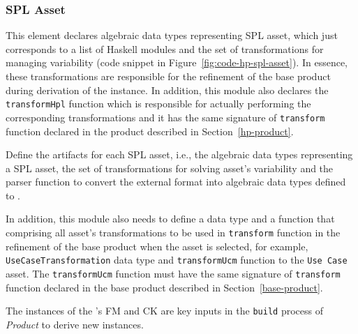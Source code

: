 
\subsubsection{\hp{} SPL Asset} 
\label{hp-spl-asset}

This element declares algebraic data types representing \hp{} SPL asset, which just corresponds to a list of Haskell modules and the set of transformations for managing \hpl{} variability (code snippet in Figure~\ref{fig:code-hp-spl-asset}). In essence, these transformations are responsible for the refinement of the base product during derivation of the \hpl{} instance. In addition, this module also declares the \texttt{transformHpl} function which is responsible for actually performing the corresponding \hpl{} transformations and it has the same signature of \texttt{transform} function declared in the \hp{} product described in Section~\ref{hp-product}.



\label{spl-assets}

Define the artifacts for each SPL asset, i.e., the algebraic data types representing a SPL asset, the set of transformations for solving asset's variability and the parser function to convert the external format into algebraic data types defined to \hpl.

In addition, this module also needs to define a data type and a function that comprising all asset's transformations to be used in \texttt{transform} function in the refinement of the base product when the asset is selected, for example, \texttt{UseCaseTransformation} data type and \texttt{transformUcm} function to the \texttt{Use Case} asset. The \texttt{transformUcm} function must have the same signature of \texttt{transform} function declared in the base product described in Section~\ref{base-product}.



The instances of the \hpl{}'s FM and CK are key inputs in the \texttt{build} process of \textit{\hp{} Product} to derive new \hpl{} instances.


